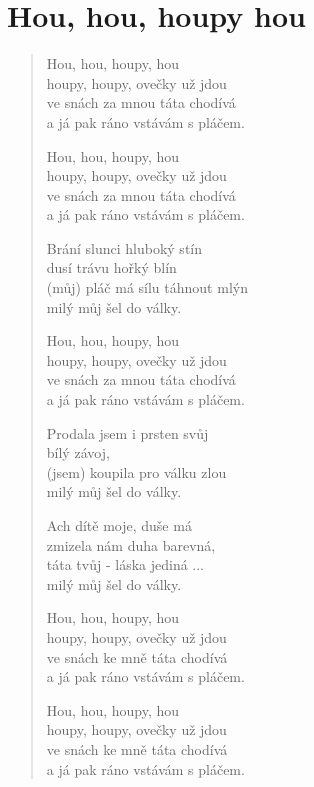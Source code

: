 \section{Hou, hou, houpy hou}

\begin{verse}
Hou, hou, houpy, hou \\
houpy, houpy, ovečky už jdou \\
ve snách za mnou táta chodívá \\
a já pak ráno vstávám s pláčem.

Hou, hou, houpy, hou \\
houpy, houpy, ovečky už jdou \\
ve snách za mnou táta chodívá \\
a já pak ráno vstávám s pláčem.

Brání slunci hluboký stín \\
dusí trávu hořký blín \\
(můj) pláč má sílu táhnout mlýn \\
milý můj šel do války. 

Hou, hou, houpy, hou \\
houpy, houpy, ovečky už jdou \\
ve snách za mnou táta chodívá \\
a já pak ráno vstávám s pláčem.

Prodala jsem i prsten svůj \\
bílý závoj,  \\
(jsem) koupila pro válku zlou \\ 
milý můj šel do války. 

Ach dítě moje, duše má \\
zmizela nám duha barevná, \\
táta tvůj - láska jediná ...\\
milý můj šel do války. 

Hou, hou, houpy, hou \\
houpy, houpy, ovečky už jdou \\
ve snách ke mně táta chodívá \\
a já pak ráno vstávám s pláčem.

Hou, hou, houpy, hou \\
houpy, houpy, ovečky už jdou \\
ve snách ke mně táta chodívá \\
a já pak ráno vstávám s pláčem.


\end{verse}
